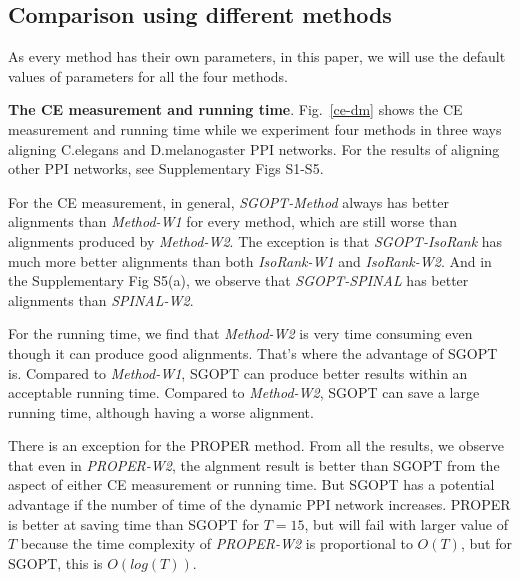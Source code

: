 \documentclass{bioinfo}
\theoremstyle{definition}
\begin{document}
\subsection{Comparison using different methods}
As every method has their own parameters, in this paper, we will use the default values of parameters for all the four methods.

\textbf{The CE measurement and running time}. Fig.~\ref{ce-dm} shows the CE measurement and running time while we experiment four methods in three ways aligning C.elegans and D.melanogaster PPI networks. For the results of aligning other PPI networks, see Supplementary Figs S1-S5. 

For the CE measurement, in general, \textit{SGOPT-Method} always has better alignments than \textit{Method-W1} for every method, which are still worse than alignments produced by \textit{Method-W2}. The exception is that \textit{SGOPT-IsoRank} has much more better alignments than both \textit{IsoRank-W1} and \textit{IsoRank-W2}. And in the Supplementary Fig S5(a), we observe that \textit{SGOPT-SPINAL} has better alignments than \textit{SPINAL-W2}.

For the running time, we find that \textit{Method-W2} is very time consuming even though it can produce good alignments. That's where the advantage of SGOPT is. Compared to \textit{Method-W1}, SGOPT can produce better results within an acceptable running time. Compared to \textit{Method-W2}, SGOPT can save a large running time, although having a worse alignment.  

There is an exception for the PROPER method. From all the results, we observe that even in \textit{PROPER-W2}, the algnment result is better than SGOPT from the aspect of either CE measurement or running time. But SGOPT has a potential advantage if the number of time of the dynamic PPI network increases. PROPER is better at saving time than SGOPT for $T=15$, but will fail with larger value of $T$ because the time complexity of \textit{PROPER-W2} is proportional to $O(T)$, but for SGOPT, this is $O(log(T))$.
\end{document}
